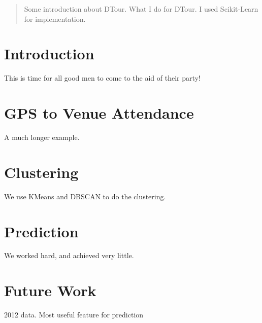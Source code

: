 \documentclass[12pt]{article}
\begin{document}
\maketitle

\begin{abstract}
Some introduction about DTour. What I do for DTour. I used Scikit-Learn \cite{sklearn} for implementation.
\end{abstract}

\section{Introduction}
This is time for all good men to come to the aid of their party!

\section{GPS to Venue Attendance}\label{gps_venue}
A much longer \LaTeXe{} example. 

\section{Clustering}\label{clustering}
We use KMeans and DBSCAN \cite{Ester96} to do the clustering.

\section{Prediction}\label{prediction}
We worked hard, and achieved very little.

\section{Future Work}\label{future_work}
2012 data. Most useful feature for prediction



\end{document}
